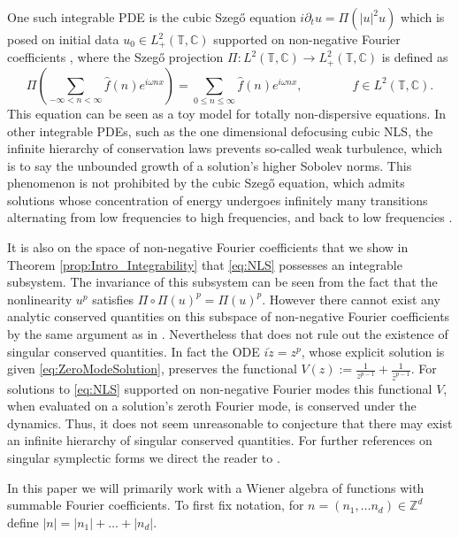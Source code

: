 \documentclass{article}
\newcommand{\C}{\mathbb{C}}
\newcommand{\Z}{\mathbb{Z}}
\newcommand{\T}{\mathbb{T}}
\begin{document}
One such integrable PDE is the cubic Szeg\H{o} equation $ i \partial_t u = \Pi(|u|^2 u)$ which is posed on initial data $u_0 \in L^2_+( \T,\C)$ supported on non-negative Fourier coefficients \cite{gerard2010cubic,gerard2012invariant,gerard2015explicit}, where the Szeg\H{o} projection  $ \Pi : L^2( \T,\C) \to L^2_+( \T,\C)$ is   defined as 
 \[
 \Pi \left(
 \sum_{- \infty < n < \infty} 
 \hat{f}(n) e^{i \omega n x} 
 \right)
 = \sum_{0 \leq n \leq \infty}  \hat{f}(n) e^{i \omega n x}
 , \qquad \qquad 
 f \in L^2( \T,\C) .
 \] 
This equation can be seen as a toy model for totally non-dispersive equations.
In other integrable PDEs, such as the one dimensional defocusing cubic NLS, the infinite hierarchy of conservation laws prevents so-called weak turbulence, which is to say the unbounded growth of a solution's higher Sobolev norms. 
This phenomenon is not prohibited by the cubic Szeg\H{o} equation, which admits solutions whose concentration of  energy undergoes infinitely many transitions alternating from low frequencies to high frequencies, and back to low frequencies \cite{gerard2017cubic,gerard2019survey}. 


It is also on the space of non-negative Fourier coefficients that we show in 
Theorem \ref{prop:Intro_Integrability} that \eqref{eq:NLS} possesses an integrable subsystem. 
The invariance of this subsystem can be seen from the fact that the nonlinearity $u^p$ satisfies $ \Pi \circ \Pi(u)^p = \Pi(u)^p$. 
However there cannot exist any analytic conserved quantities on this subspace of non-negative Fourier coefficients by the same argument as in \cite{jaquette2020global}. 
Nevertheless that does not rule out the existence of singular conserved quantities. 
In fact the ODE $ i \dot{z} = z^p$, whose explicit solution is given \eqref{eq:ZeroModeSolution}, preserves the functional $V(z) := \frac{1}{z^{p-1} } + \frac{1}{\bar{z}^{p-1}}$. 
For solutions to \eqref{eq:NLS} supported on non-negative Fourier modes this  functional $V$, when evaluated on a solution's zeroth Fourier mode, is conserved under the dynamics. 
Thus, it does not seem unreasonable to conjecture that there may exist an infinite hierarchy of singular conserved quantities. 
For further  references on singular symplectic forms we direct the  reader to \cite{braddell2019invitation}. 



In this paper we will primarily work with a Wiener algebra of functions with summable Fourier coefficients.  
To first fix notation, for $n = (n_1,\dots n_d) \in \Z^d$ define $ | n| = |n_1 | + \dots + | n_d|$. 
\end{document}
